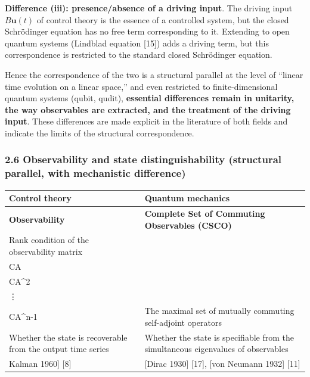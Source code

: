\documentclass[
]{article}
\newcounter{none} %
\begin{document}
\textbf{Difference (iii): presence/absence of a driving input}. The
driving input \(B\mathbf{u}(t)\) of control theory is the essence of a
controlled system, but the closed Schrödinger equation has no free term
corresponding to it. Extending to open quantum systems (Lindblad
equation {[}15{]}) adds a driving term, but this correspondence is
restricted to the standard closed Schrödinger equation.

Hence the correspondence of the two is a structural parallel at the
level of ``linear time evolution on a linear space,'' and even
restricted to finite-dimensional quantum systems (qubit, qudit),
\textbf{essential differences remain in unitarity, the way observables
are extracted, and the treatment of the driving input}. These
differences are made explicit in the literature of both fields and
indicate the limits of the structural correspondence.

\subsubsection{2.6 Observability and state distinguishability
(structural parallel, with mechanistic
difference)}\label{observability-and-state-distinguishability-structural-parallel-with-mechanistic-difference}

{\def\LTcaptype{none} %
\begin{longtable}[]{@{}
  >{\raggedright\arraybackslash}p{}
  >{\raggedright\arraybackslash}p{}@{}}
\toprule\noalign{}
\begin{minipage}[b]{\linewidth}\raggedright
Control theory
\end{minipage} & \begin{minipage}[b]{\linewidth}\raggedright
Quantum mechanics
\end{minipage} \\
\midrule\noalign{}
\endhead
\bottomrule\noalign{}
\endlastfoot
\textbf{Observability} & \textbf{Complete Set of Commuting Observables
(CSCO)} \\
Rank condition of the observability matrix
\(\mathcal{O} = \begin{pmatrix}C\\CA\\CA^2\\\vdots\\CA^{n-1}\end{pmatrix}\)
& The maximal set of mutually commuting self-adjoint operators \\
Whether the state is recoverable from the output time series & Whether
the state is specifiable from the simultaneous eigenvalues of
observables \\
{[}Kalman 1960{]} {[}8{]} & {[}Dirac 1930{]} {[}17{]}, {[}von Neumann
1932{]} {[}11{]} \\
\end{longtable}
}
\end{document}
